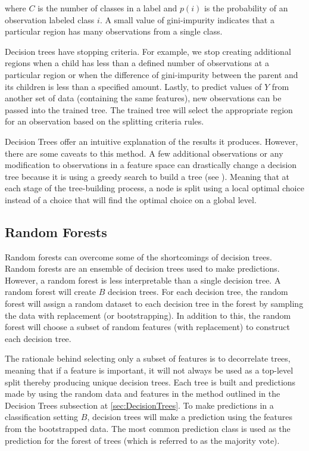 \noindent where \(C\) is the number of classes in a label and \(p(i)\) is the probability of an observation labeled class \(i\).  A small value of gini-impurity indicates that a particular region has many observations from a single class. 

Decision trees have stopping criteria.  For example, we stop creating additional regions when a child has less than a defined number of observations at a particular region or when the difference of gini-impurity between the parent and its children is less than a specified amount.  Lastly, to predict values of \(Y\) from another set of data (containing the same features), new observations can be passed into the trained tree.  The trained tree will select the appropriate region for an observation based on the splitting criteria rules. 

Decision Trees offer an intuitive explanation of the results it produces. However, there are some caveats to this method.  A few additional observations or any modification to observations in a feature space can drastically change a decision tree because it is using a greedy search to build a tree (see \cite{koning2017decision}). Meaning that at each stage of the tree-building process, a node is split using a local optimal choice instead of a choice that will find the optimal choice on a global level. 

\subsection{Random Forests} \label{sec:RandomForest}

Random forests can overcome some of the shortcomings of decision trees.  Random forests are an ensemble of decision trees used to make predictions. However, a random forest is less interpretable than a single decision tree.  A random forest will create \(B\) decision trees.  For each decision tree,  the random forest will assign a random dataset to each decision tree in the forest by sampling the data with replacement (or bootstrapping). In addition to this, the random forest will choose a subset of random features (with replacement) to construct each decision tree. 
 
The rationale behind selecting only a subset of features is to decorrelate trees, meaning that if a feature is important, it will not always be used as a top-level split thereby producing unique decision trees. Each tree is built and predictions made by using the random data and features in the method outlined in the Decision Trees subsection at \ref{sec:DecisionTrees}. To make predictions in a classification setting \(B\), decision trees will make a prediction using the features from the bootstrapped data. The most common prediction class is used as the prediction for the forest of trees (which is referred to as the majority vote).

